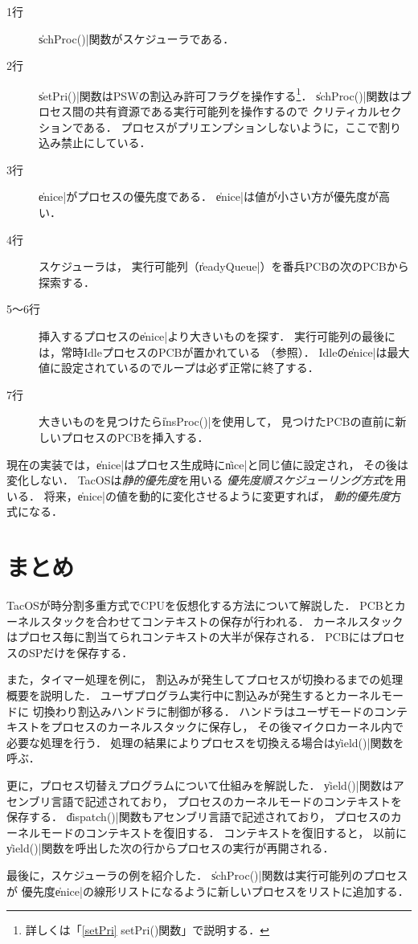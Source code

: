 

\begin{description}
\item[1行] \|schProc()|関数がスケジューラである．
\item[2行] \|setPri()|関数はPSWの割込み許可フラグを操作する\footnote{
  詳しくは「\ref{setPri} setPri()関数」で説明する．}．
  \|schProc()|関数はプロセス間の共有資源である実行可能列を操作するので
  クリティカルセクションである．
  プロセスがプリエンプションしないように，ここで割り込み禁止にしている．
\item[3行] \|enice|がプロセスの優先度である．
  \|enice|は値が小さい方が優先度が高い．
\item[4行] スケジューラは，
  実行可能列（\|readyQueue|）を番兵PCBの次のPCBから探索する．
\item[5〜6行] 挿入するプロセスの\|enice|より大きいものを探す．
  実行可能列の最後には，常時IdleプロセスのPCBが置かれている
  （参照）．
  Idleの\|enice|は最大値に設定されているのでループは必ず正常に終了する．
\item[7行] 大きいものを見つけたら\|insProc()|を使用して，
  見つけたPCBの直前に新しいプロセスのPCBを挿入する．
\end{description}

現在の実装では，\|enice|はプロセス生成時に\|nice|と同じ値に設定され，
その後は変化しない．
TacOSは\emph{静的優先度}を用いる
\emph{優先度順スケジューリング方式}を用いる．
将来，\|enice|の値を動的に変化させるように変更すれば，
\emph{動的優先度}方式になる．

\section{まとめ}
TacOSが時分割多重方式でCPUを仮想化する方法について解説した．
PCBとカーネルスタックを合わせてコンテキストの保存が行われる．
カーネルスタックはプロセス毎に割当てられコンテキストの大半が保存される．
PCBにはプロセスのSPだけを保存する．

また，タイマー処理を例に，
割込みが発生してプロセスが切換わるまでの処理概要を説明した．
ユーザプログラム実行中に割込みが発生するとカーネルモードに
切換わり割込みハンドラに制御が移る．
ハンドラはユーザモードのコンテキストをプロセスのカーネルスタックに保存し，
その後マイクロカーネル内で必要な処理を行う．
処理の結果によりプロセスを切換える場合は\|yield()|関数を呼ぶ．

更に，プロセス切替えプログラムについて仕組みを解説した．
\|yield()|関数はアセンブリ言語で記述されており，
プロセスのカーネルモードのコンテキストを保存する．
\|dispatch()|関数もアセンブリ言語で記述されており，
プロセスのカーネルモードのコンテキストを復旧する．
コンテキストを復旧すると，
以前に\|yield()|関数を呼出した次の行からプロセスの実行が再開される．

最後に，スケジューラの例を紹介した．
\|schProc()|関数は実行可能列のプロセスが
優先度\|enice|の線形リストになるように新しいプロセスをリストに追加する．
